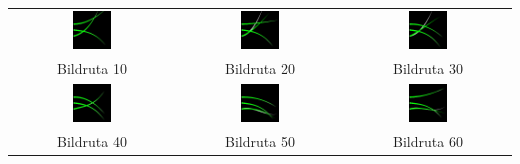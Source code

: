 \documentclass[]{beamer}
\begin{document}
\begin{frame}
  \begin{center}
    \begin{tabular}{ccc}
      \includegraphics[width=0.25\textwidth]{tracking-256/frame10.png}
      & \includegraphics[width=0.25\textwidth]{tracking-256/frame20.png}
      & \includegraphics[width=0.25\textwidth]{tracking-256/frame30.png}
      \\
      Bildruta 10 & Bildruta 20 & Bildruta 30\\
      \includegraphics[width=0.25\textwidth]{tracking-256/frame40.png}
      & \includegraphics[width=0.25\textwidth]{tracking-256/frame50.png}
      & \includegraphics[width=0.25\textwidth]{tracking-256/frame60.png}
      \\
      Bildruta 40 & Bildruta 50 & Bildruta 60\\
    \end{tabular}
  \end{center}
\end{frame}
\end{document}
